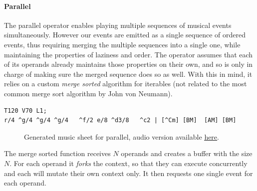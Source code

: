 \documentclass[a4paper,UKenglish,cleveref, autoref]{oasics-v2019}
\begin{document}

\paragraph*{Parallel}
The parallel operator enables playing multiple sequences of musical events simultaneously. However our events are emitted as a single sequence of ordered events, thus requiring merging the multiple sequences into a single one, while maintaining the properties of laziness and order. The operator assumes that each of its operands already maintains those properties on their own, and so is only in charge of making sure the merged sequence does so as well. With this in mind, it relies on a custom \textit{merge sorted} algorithm for iterables (not related to the most common merge sort algorithm by John von Neumann).

\begin{lstlisting}[caption={Snippet of the song \textit{Soft to Be Strong} by Marina},label=list:6,captionpos=t,abovecaptionskip=-\medskipamount]
T120 V70 L1;
r/4 ^g/4 ^g/4 ^g/4   ^f/2 e/8 ^d3/8   ^c2 | [^Cm] [BM]  [AM] [BM] 
\end{lstlisting}

\begin{figure}[ht]
  \centering
  {%
  \setlength{\fboxsep}{0pt}%
  \setlength{\fboxrule}{0pt}%
  }%
  \caption{Generated music sheet for parallel, audio version available \href{https://drive.google.com/open?id=1ENTm3hZonYHyQIOgRZ8TQ1Qz-AfRLt2I}{\underline{here}}\protect\footnotemark.}
  \label{fig:parallel}
\end{figure}

The merge sorted function receives $N$ operands and creates a buffer with the size $N$. For each operand it \textit{forks} the context, so that they can execute concurrently and each will mutate their own context only. It then requests one single event for each operand.
\end{document}
